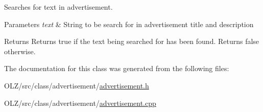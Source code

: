 Searches for text in advertisement. 


\begin{DoxyParams}{Parameters}
{\em text} & String to be search for in advertisement title and description\\
\hline
\end{DoxyParams}
\begin{DoxyReturn}{Returns}
Returns true if the text being searched for has been found. Returns false otherwise. 
\end{DoxyReturn}


The documentation for this class was generated from the following files\+:\begin{DoxyCompactItemize}
\item 
O\+L\+Z/src/class/advertisement/\hyperlink{advertisement_8h}{advertisement.\+h}\item 
O\+L\+Z/src/class/advertisement/\hyperlink{advertisement_8cpp}{advertisement.\+cpp}\end{DoxyCompactItemize}
